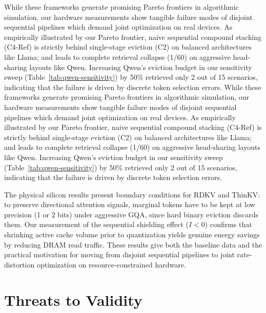 \documentclass[sigconf,nonacm]{acmart}
\begin{document}
\begin{itemize}
While these frameworks generate promising Pareto frontiers in algorithmic simulation, our hardware measurements show tangible failure modes of disjoint sequential pipelines which demand joint optimization on real devices. As empirically illustrated by our Pareto frontier, naive sequential compound stacking (C4-Ref) is strictly behind single-stage eviction (C2) on balanced architectures like Llama; and leads to complete retrieval collapse (1/60) on aggressive head-sharing layouts like Qwen. Increasing Qwen's eviction budget in our sensitivity sweep (Table~\ref{tab:qwen-sensitivity}) by 50\% retrieved only 2 out of 15 scenarios, indicating that the failure is driven by discrete token selection errors.
While these frameworks generate promising Pareto frontiers in algorithmic simulation, our hardware measurements show tangible failure modes of disjoint sequential pipelines which demand joint optimization on real devices. As empirically illustrated by our Pareto frontier, naive sequential compound stacking (C4-Ref) is strictly behind single-stage eviction (C2) on balanced architectures like Llama; and leads to complete retrieval collapse (1/60) on aggressive head-sharing layouts like Qwen. Increasing Qwen's eviction budget in our sensitivity sweep (Table~\ref{tab:qwen-sensitivity}) by 50\% retrieved only 2 out of 15 scenarios, indicating that the failure is driven by discrete token selection errors.

The physical silicon results present boundary conditions for RDKV and ThinKV: to preserve directional attention signals, marginal tokens have to be kept at low precision (1 or 2 bits) under aggressive GQA, since hard binary eviction discards them. Our measurement of the sequential shielding effect ($I < 0$) confirms that shrinking active cache volume prior to quantization yields genuine energy savings by reducing DRAM read traffic. These results give both the baseline data and the practical motivation for moving from disjoint sequential pipelines to joint rate-distortion optimization on resource-constrained hardware.


\section{Threats to Validity}


\end{itemize}
\end{document}
